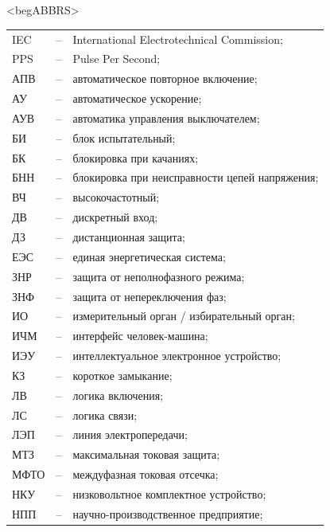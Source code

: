 \color{unimain}\section*{}
{\color{white}\fontsize{0.1pt}{0.1pt}\selectfont<begABBRS>}
\color{black}
\begin{longtable}{>{\raggedright\arraybackslash}m{2cm}>{\raggedright\arraybackslash}m{0.5cm}>{\raggedright\arraybackslash}m{20cm}}
\endfirsthead\endhead\endfoot\endlastfoot
IEC & -- &  International Electrotechnical Commission; \\
PPS & -- & Pulse Per Second; \\
АПВ & -- & автоматическое повторное включение; \\
АУ & -- & автоматическое ускорение; \\
АУВ & -- & автоматика управления выключателем; \\
БИ & -- & блок испытательный; \\
БК & -- & блокировка при качаниях; \\
БНН & -- & блокировка при неисправности цепей напряжения; \\
ВЧ & -- & высокочастотный; \\
ДВ & -- & дискретный вход; \\
ДЗ & -- & дистанционная защита; \\
ЕЭС & -- & единая энергетическая система; \\
ЗНР & -- & защита от неполнофазного режима; \\
ЗНФ & -- & защита от непереключения фаз; \\
ИО & -- & измерительный орган / избирательный орган; \\
ИЧМ & -- & интерфейс человек-машина; \\
ИЭУ & -- & интеллектуальное электронное устройство; \\
КЗ & -- & короткое замыкание; \\
ЛВ & -- & логика включения; \\
ЛС & -- & логика связи; \\
ЛЭП & -- & линия электропередачи; \\
МТЗ & -- & максимальная токовая защита; \\
МФТО & -- & междуфазная токовая отсечка; \\
НКУ & -- & низковольтное комплектное устройство; \\
НПП & -- & научно-производственное предприятие; \\

\end{longtable}
